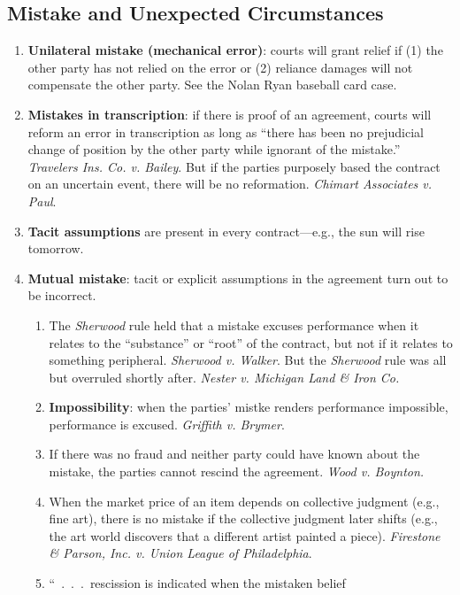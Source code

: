 \subsection{Mistake and Unexpected Circumstances}
\begin{enumerate}
    \item \textbf{Unilateral mistake (mechanical error)}: courts will grant 
    relief if (1) the other party has not relied on the error or (2) reliance 
    damages will not compensate the other party. See the Nolan Ryan baseball 
    card case.
    \item \textbf{Mistakes in transcription}: if there is proof of an 
    agreement, courts will reform an error in transcription as long as ``there 
    has been no prejudicial change of position by the other party while 
    ignorant of the mistake.'' \emph{Travelers Ins. Co. v. Bailey}. But if the 
    parties purposely based the contract on an uncertain event, there will be 
    no reformation. \emph{Chimart Associates v. Paul}.
    \item \textbf{Tacit assumptions} are present in every contract---e.g., the 
    sun will rise tomorrow.
    \item \textbf{Mutual mistake}: tacit or explicit assumptions in the 
    agreement turn out to be incorrect.
    \begin{enumerate}
        \item The \emph{Sherwood} rule held that a mistake excuses performance 
        when it relates to the ``substance'' or ``root'' of the contract, but 
        not if it relates to something peripheral. \emph{Sherwood v. Walker}. 
        But the \emph{Sherwood} rule was all but overruled shortly after. 
        \emph{Nester v. Michigan Land \& Iron Co.}
        \item \textbf{Impossibility}: when the parties' mistke renders 
        performance impossible, performance is excused. \emph{Griffith v. 
        Brymer}.
        \item If there was no fraud and neither party could have known about 
        the mistake, the parties cannot rescind the agreement. \emph{Wood v. 
        Boynton.}
        \item When the market price of an item depends on collective judgment 
        (e.g., fine art), there is no mistake if the collective judgment later 
        shifts (e.g., the art world discovers that a different artist painted 
        a piece). \emph{Firestone \& Parson, Inc. v. Union League of 
        Philadelphia}.
        \item ``~.~.~.~rescission is indicated when the mistaken belief 

\end{enumerate}
\end{enumerate}
